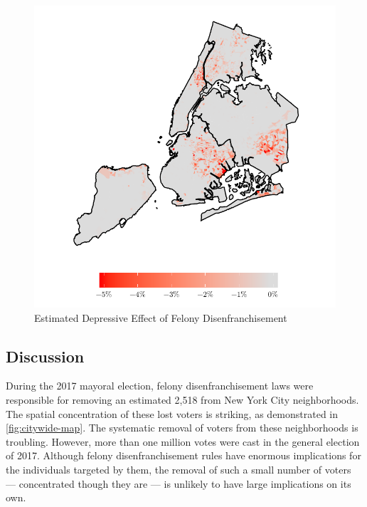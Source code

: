 \documentclass[]{article}
\begin{document}
\begin{figure}[H]

{\centering \includegraphics{felony_disenfranchisement_nys_files/figure-latex/postest-map-1} 

}

\caption{\label{fig:postest}Estimated Depressive Effect of Felony Disenfranchisement}\label{fig:postest-map}
\end{figure}

\hypertarget{discussion}{%
\subsection*{Discussion}\label{discussion}}

During the 2017 mayoral election, felony disenfranchisement laws were responsible for removing an estimated 2,518 from New York City neighborhoods. The spatial concentration of these lost voters is striking, as demonstrated in \ref{fig:citywide-map}. The systematic removal of voters from these neighborhoods is troubling. However, more than one million votes were cast in the general election of 2017. Although felony disenfranchisement rules have enormous implications for the individuals targeted by them, the removal of such a small number of voters --- concentrated though they are --- is unlikely to have large implications on its own.
\end{document}
